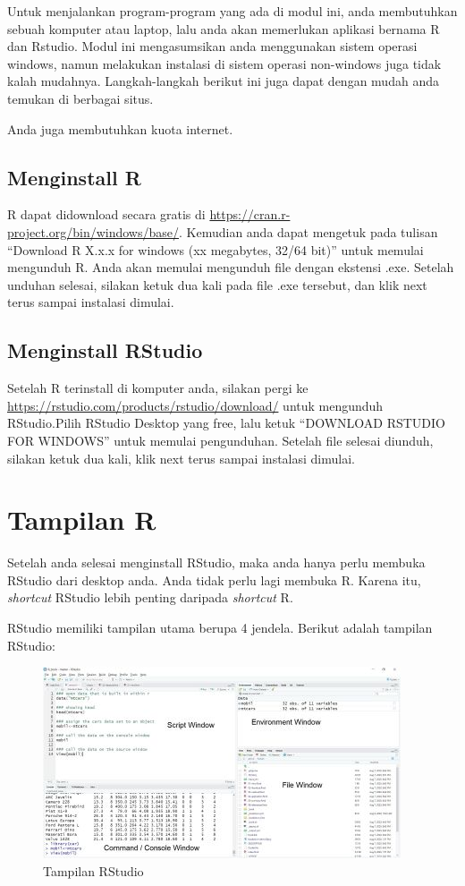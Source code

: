 \documentclass[
]{book}
\begin{document}
Untuk menjalankan program-program yang ada di modul ini, anda membutuhkan sebuah komputer atau laptop, lalu anda akan memerlukan aplikasi bernama R dan Rstudio. Modul ini mengasumsikan anda menggunakan sistem operasi windows, namun melakukan instalasi di sistem operasi non-windows juga tidak kalah mudahnya. Langkah-langkah berikut ini juga dapat dengan mudah anda temukan di berbagai situs.

Anda juga membutuhkan kuota internet.

\hypertarget{menginstall-r}{%
\subsection{Menginstall R}\label{menginstall-r}}

R dapat didownload secara gratis di \url{https://cran.r-project.org/bin/windows/base/}. Kemudian anda dapat mengetuk pada tulisan ``Download R X.x.x for windows (xx megabytes, 32/64 bit)'' untuk memulai mengunduh R. Anda akan memulai mengunduh file dengan ekstensi .exe. Setelah unduhan selesai, silakan ketuk dua kali pada file .exe tersebut, dan klik next terus sampai instalasi dimulai.

\hypertarget{menginstall-rstudio}{%
\subsection{Menginstall RStudio}\label{menginstall-rstudio}}

Setelah R terinstall di komputer anda, silakan pergi ke \url{https://rstudio.com/products/rstudio/download/} untuk mengunduh RStudio.Pilih RStudio Desktop yang free, lalu ketuk ``DOWNLOAD RSTUDIO FOR WINDOWS'' untuk memulai pengunduhan. Setelah file selesai diunduh, silakan ketuk dua kali, klik next terus sampai instalasi dimulai.

\hypertarget{tampilan-r}{%
\section{Tampilan R}\label{tampilan-r}}

Setelah anda selesai menginstall RStudio, maka anda hanya perlu membuka RStudio dari desktop anda. Anda tidak perlu lagi membuka R. Karena itu, \emph{shortcut} RStudio lebih penting daripada \emph{shortcut} R.

RStudio memiliki tampilan utama berupa 4 jendela. Berikut adalah tampilan RStudio:

\begin{figure}
\centering
\includegraphics{tampilanR2.JPG}
\caption{\label{fig:unnamed-chunk-1}Tampilan RStudio}
\end{figure}
\end{document}
